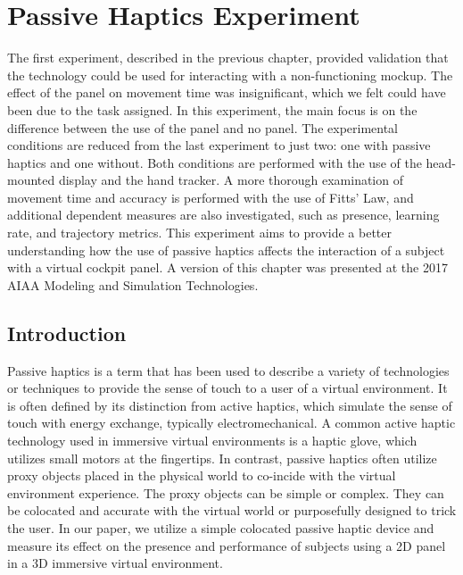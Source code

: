 \chapter{Passive Haptics Experiment}
\label{chap:ph_exp}

The first experiment, described in the previous chapter, provided validation that the technology could be used for interacting with a non-functioning mockup.
The effect of the panel on movement time was insignificant, which we felt could have been due to the task assigned.
In this experiment, the main focus is on the difference between the use of the panel and no panel.
The experimental conditions are reduced from the last experiment to just two: one with passive haptics and one without.
Both conditions are performed with the use of the head-mounted display and the hand tracker.
A more thorough examination of movement time and accuracy is performed with the use of Fitts' Law, and additional dependent measures are also investigated, such as presence, learning rate, and trajectory metrics.
This experiment aims to provide a better understanding how the use of passive haptics affects the interaction of a subject with a virtual cockpit panel.
A version of this chapter was presented at the 2017 AIAA Modeling and Simulation Technologies\cite{joyce_passive_2017}.

\section{Introduction}

Passive haptics is a term that has been used to describe a variety of technologies or techniques to provide the sense of touch to a user of a virtual environment.
It is often defined by its distinction from active haptics, which simulate the sense of touch with energy exchange, typically electromechanical.
A common active haptic technology used in immersive virtual environments is a haptic glove, which utilizes small motors at the fingertips.
In contrast, passive haptics often utilize proxy objects placed in the physical world to co-incide with the virtual environment experience.
The proxy objects can be simple or complex.
They can be colocated and accurate with the virtual world or purposefully designed to trick the user.
In our paper, we utilize a simple colocated passive haptic device and measure its effect on the presence and performance of subjects using a 2D panel in a 3D immersive virtual environment.

